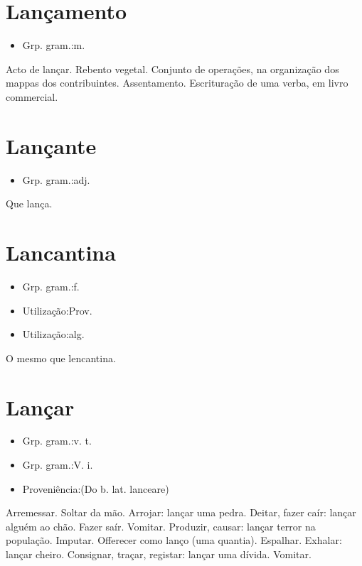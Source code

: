 \section{Lançamento}
\begin{itemize}
\item {Grp. gram.:m.}
\end{itemize}
Acto de lançar.
Rebento vegetal.
Conjunto de operações, na organização dos mappas dos contribuintes.
Assentamento.
Escrituração de uma verba, em livro commercial.
\section{Lançante}
\begin{itemize}
\item {Grp. gram.:adj.}
\end{itemize}
Que lança.
\section{Lancantina}
\begin{itemize}
\item {Grp. gram.:f.}
\end{itemize}
\begin{itemize}
\item {Utilização:Prov.}
\end{itemize}
\begin{itemize}
\item {Utilização:alg.}
\end{itemize}
O mesmo que \textunderscore lencantina\textunderscore .
\section{Lançar}
\begin{itemize}
\item {Grp. gram.:v. t.}
\end{itemize}
\begin{itemize}
\item {Grp. gram.:V. i.}
\end{itemize}
\begin{itemize}
\item {Proveniência:(Do b. lat. \textunderscore lanceare\textunderscore )}
\end{itemize}
Arremessar.
Soltar da mão.
Arrojar: \textunderscore lançar uma pedra\textunderscore .
Deitar, fazer caír: \textunderscore lançar alguém ao chão\textunderscore .
Fazer saír.
Vomitar.
Produzir, causar: \textunderscore lançar terror na população\textunderscore .
Imputar.
Offerecer como lanço (uma quantia).
Espalhar.
Exhalar: \textunderscore lançar cheiro\textunderscore .
Consignar, traçar, registar: \textunderscore lançar uma dívida\textunderscore .
Vomitar.

